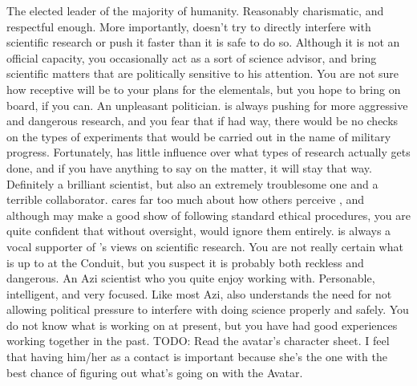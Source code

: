 \documentclass[char]{guildcamp1}
\begin{document}
\begin{contacts}
  \contact{\cLeader{}} The elected leader of the majority of humanity. Reasonably charismatic, and respectful enough. More importantly, \cLeader{\they} doesn't try to directly interfere with scientific research or push it faster than it is safe to do so. Although it is not an official capacity, you occasionally act as a sort of science advisor, and bring scientific matters that are politically sensitive to his attention. You are not sure how receptive \cLeader{\they} will be to your plans for the elementals, but you hope to bring \cLeader{\them} on board, if you can.
	\contact{\cDema{}} An unpleasant politician. \cDema{\They} is always pushing for more aggressive and dangerous research, and you fear that if \cDema{\they} had \cDema{\their} way, there would be no checks on the types of experiments that would be carried out in the name of military progress. Fortunately, \cDema{\they} has little influence over what types of research actually gets done, and if you have anything to say on the matter, it will stay that way.
	\contact{\cMS{}} Definitely a brilliant scientist, but also an extremely troublesome one and a terrible collaborator. \cMS{\They} cares far too much about how others perceive \cMS{\them}, and although \cMS{\they} may make a good show of following standard ethical procedures, you are quite confident that without oversight, \cMS{\they} would ignore them entirely. \cMS{\They} is always a vocal supporter of \cDema{}'s views on scientific research. You are not really certain what \cMS{\they} is up to at the Conduit, but you suspect it is probably both reckless and dangerous.
	\contact{\cScientist{}} An Azi scientist who you quite enjoy working with. Personable, intelligent, and very focused. Like most Azi, \cScientist{\they} also understands the need for not allowing political pressure to interfere with doing science properly and safely. You do not know what \cScientist{\they} is working on at present, but you have had good experiences working together in the past.
  \contact{\cAvatar{}} TODO: Read the avatar's character sheet. I feel that having him/her as a contact is important because she's the one with the best chance of figuring out what's going on with the Avatar.
\end{contacts}
\end{document}
